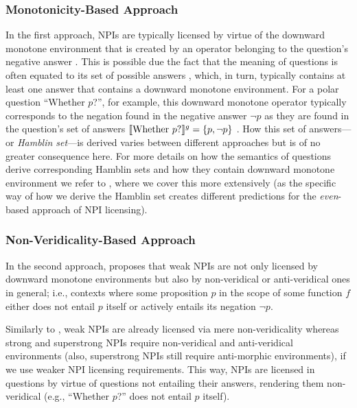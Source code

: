 \subsubsection{Monotonicity-Based Approach}
In the first approach, NPIs are typically licensed by virtue of the downward monotone environment that is created by an operator belonging to the question's negative answer \parencite{Guerzoni2004,Guerzoni2014,Nicolae2013,Nicolae2015}. This is possible due the fact that the meaning of questions is often equated to its set of possible answers \parencite{Hamblin1973}, which, in turn, typically contains at least one answer that contains a downward monotone environment. For a polar question \enquote{Whether $p$?}, for example, this downward monotone operator typically corresponds to the negation found in the negative answer $\neg p$ \parencite{Guerzoni2004,Guerzoni2014} as they are found in the question's set of answers $\llbracket\text{Whether $p$?}\rrbracket^{g}=\{p,\neg p\}$ \parencite{Hamblin1973}. How this set of answers---or \textit{Hamblin set}---is derived varies between different approaches but is of no greater consequence here. For more details on how the semantics of questions derive corresponding Hamblin sets and how they contain downward monotone environment we refer to , where we cover this more extensively (as the specific way of how we derive the Hamblin set creates different predictions for the \textit{even}-based approach of NPI licensing).

\subsubsection{Non-Veridicality-Based Approach}
In the second approach, \textcite{Giannakidou1998} proposes that weak NPIs are not only licensed by downward monotone environments but also by non-veridical or anti-veridical ones in general; i.e., contexts where some proposition $p$ in the scope of some function $f$ either does not entail $p$ itself or actively entails its negation $\neg p$.
\ex\label{def:nonveridicality}%

\xe
\ex\label{def:antiveridicality}%

\xe
Similarly to , weak NPIs are already licensed via mere non-veridicality whereas strong and superstrong NPIs require non-veridical and anti-veridical environments (also, superstrong NPIs still require anti-morphic environments), if we use  weaker NPI licensing requirements. This way, NPIs are licensed in questions by virtue of questions not entailing their answers, rendering them non-veridical (e.g., \enquote{Whether $p$?} does not entail $p$ itself).

